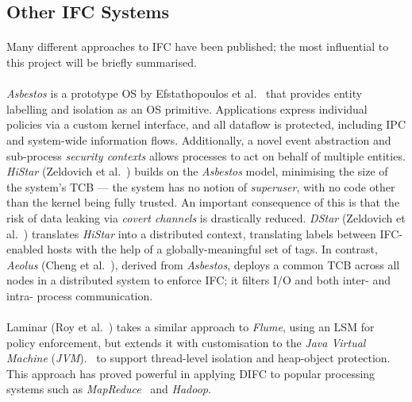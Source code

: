 \subsection{Other IFC Systems}
\paragraph{} Many different approaches to IFC have been published; the most influential to this project will be briefly summarised.

\paragraph{} \textit{Asbestos} is a prototype OS by Efstathopoulos et al.~\cite{asbestos} that provides entity labelling and isolation as an OS primitive. Applications express individual policies via a custom kernel interface, and all dataflow is protected, including IPC and system-wide information flows. Additionally, a novel event abstraction and sub-process \textit{security contexts} allows processes to act on behalf of multiple entities. \textit{HiStar} (Zeldovich et al.~\cite{10.5555/1298455.1298481}) builds on the \textit{Asbestos} model, minimising the size of the system's TCB --- the system has no notion of \textit{superuser}, with no code other than the kernel being fully trusted. An important consequence of this is that the risk of data leaking via \textit{covert channels} is drastically reduced. \textit{DStar} (Zeldovich et al.~\cite{10.5555/1387589.1387610}) translates \textit{HiStar} into a distributed context, translating labels between IFC-enabled hosts with the help of a globally-meaningful set of tags. In contrast, \textit{Aeolus} (Cheng et al.~\cite{10.5555/2342821.2342833}), derived from \textit{Asbestos}, deploys a common TCB across all nodes in a distributed system to enforce IFC; it filters I/O and both inter- and intra- process communication.

\paragraph{} Laminar (Roy et al.~\cite{10.1145/1543135.1542484}) takes a similar approach to \textit{Flume}, using an LSM for policy enforcement, but extends it with customisation to the \textit{Java Virtual Machine} (\textit{JVM}).~\cite{jvm} to support thread-level isolation and heap-object protection. This approach has proved powerful in applying DIFC to popular processing systems such as \textit{MapReduce}~\cite{mapreduce} and \textit{Hadoop}.~\cite{hadoop}


